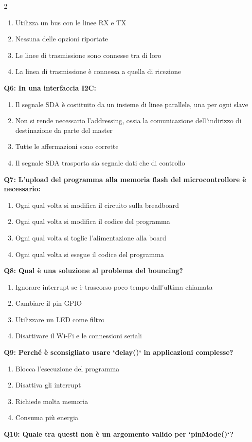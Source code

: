 \documentclass[10pt]{article}
\begin{document}
\begin{multicols}{2}
\begin{enumerate}[label=\arabic*.]
\item Utilizza un bus con le linee RX e TX
\item Nessuna delle opzioni riportate
\item Le linee di trasmissione sono connesse tra di loro
\item La linea di trasmissione è connessa a quella di ricezione
\end{enumerate}
\textbf{Q6: In una interfaccia I2C:}

\begin{enumerate}[label=\arabic*.]
\item Il segnale SDA è costituito da un insieme di linee parallele, una per ogni slave
\item Non si rende necessario l'addressing, ossia la comunicazione dell'indirizzo di destinazione da parte del master
\item Tutte le affermazioni sono corrette
\item Il segnale SDA trasporta sia segnale dati che di controllo
\end{enumerate}
\textbf{Q7: L'upload del programma alla memoria flash del microcontrollore è necessario:}

\begin{enumerate}[label=\arabic*.]
\item Ogni qual volta si modifica il circuito sulla breadboard
\item Ogni qual volta si modifica il codice del programma
\item Ogni qual volta si toglie l'alimentazione alla board
\item Ogni qual volta si esegue il codice del programma
\end{enumerate}
\textbf{Q8: Qual è una soluzione al problema del bouncing?}

\begin{enumerate}[label=\arabic*.]
\item Ignorare interrupt se è trascorso poco tempo dall'ultima chiamata
\item Cambiare il pin GPIO
\item Utilizzare un LED come filtro
\item Disattivare il Wi-Fi e le connessioni seriali
\end{enumerate}
\textbf{Q9: Perché è sconsigliato usare `delay()` in applicazioni complesse?}

\begin{enumerate}[label=\arabic*.]
\item Blocca l’esecuzione del programma
\item Disattiva gli interrupt
\item Richiede molta memoria
\item Consuma più energia
\end{enumerate}
\textbf{Q10: Quale tra questi non è un argomento valido per `pinMode()`?}


\end{multicols}
\end{document}
